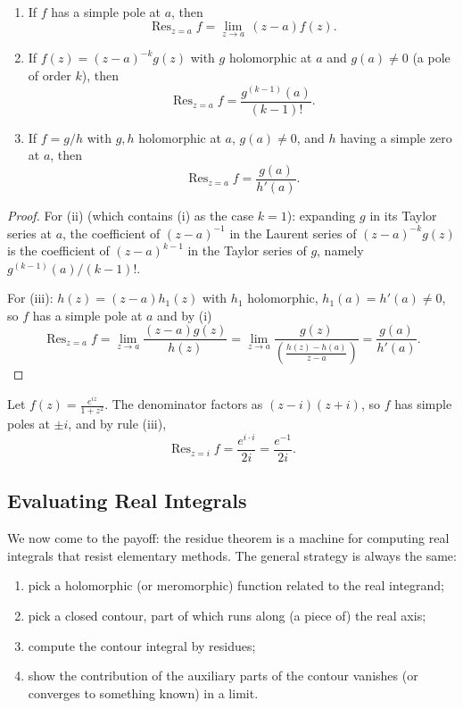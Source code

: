 \documentclass[a4paper]{scrartcl}
\begin{document}
\begin{proposition}~
    \vspace*{-1.5\baselineskip}
    \begin{enumerate}[label=(\roman*)]
        \item If $f$ has a simple pole at $a$, then
        $$
        \operatorname{Res}_{z = a} f = \lim_{z \to a}\, (z - a) f(z).
        $$
        \item If $f(z) = (z - a)^{-k} g(z)$ with $g$ holomorphic at $a$ and $g(a) \neq 0$ (a pole of order $k$), then
        $$
        \operatorname{Res}_{z = a} f = \frac{g^{(k - 1)}(a)}{(k - 1)!}.
        $$
        \item If $f = g/h$ with $g, h$ holomorphic at $a$, $g(a) \neq 0$, and $h$ having a simple zero at $a$, then
        $$
        \operatorname{Res}_{z = a} f = \frac{g(a)}{h'(a)}.
        $$
    \end{enumerate}
\end{proposition}
\begin{proof}
    For (ii) (which contains (i) as the case $k = 1$): expanding $g$ in its Taylor series at $a$, the coefficient of $(z-a)^{-1}$ in the Laurent series of $(z - a)^{-k}g(z)$ is the coefficient of $(z - a)^{k - 1}$ in the Taylor series of $g$, namely $g^{(k - 1)}(a)/(k - 1)!$.

    For (iii): $h(z) = (z - a)h_1(z)$ with $h_1$ holomorphic, $h_1(a) = h'(a) \neq 0$, so $f$ has a simple pole at $a$ and by (i)
    \[
    \operatorname{Res}_{z = a} f = \lim_{z \to a} \frac{(z - a)g(z)}{h(z)} = \lim_{z \to a} \frac{g(z)}{\left(\frac{h(z) - h(a)}{z - a}\right)} = \frac{g(a)}{h'(a)}.
    \]
\end{proof}

\begin{example}
    Let $f(z) = \frac{e^{iz}}{1 + z^2}$. The denominator factors as $(z - i)(z + i)$, so $f$ has simple poles at $\pm i$, and by rule (iii),
    $$
    \operatorname{Res}_{z = i} f = \frac{e^{i \cdot i}}{2i} = \frac{e^{-1}}{2i}.
    $$
\end{example}

\subsection{Evaluating Real Integrals}

We now come to the payoff: the residue theorem is a machine for computing real integrals that resist elementary methods. The general strategy is always the same:
\begin{enumerate}[label=(\arabic*)]
    \item pick a holomorphic (or meromorphic) function related to the real integrand;
    \item pick a closed contour, part of which runs along (a piece of) the real axis;
    \item compute the contour integral by residues;
    \item show the contribution of the auxiliary parts of the contour vanishes (or converges to something known) in a limit.
\end{enumerate}
\end{document}
